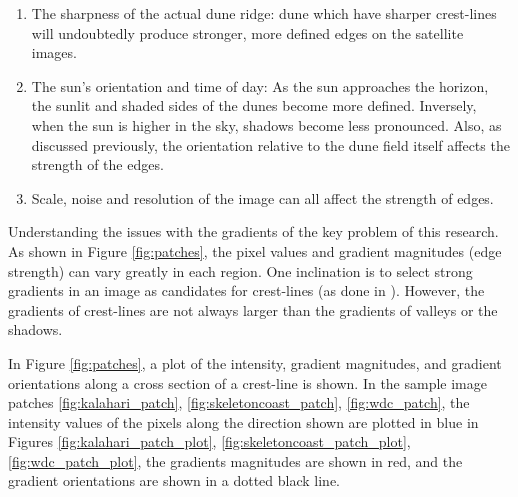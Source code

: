   \begin{enumerate}
	\item The sharpness of the actual dune ridge: dune which have sharper crest-lines will undoubtedly produce stronger, more defined edges on the satellite images.
	\item The sun's orientation and time of day: As the sun approaches the horizon, the sunlit and shaded sides of the dunes become more defined. Inversely, when the sun is higher in the sky, shadows become less pronounced. Also, as discussed previously, the orientation relative to the dune field itself affects the strength of the edges.
	\item Scale, noise and resolution of the image can all affect the strength of edges.
  \end{enumerate}

Understanding the issues with the gradients of the key problem of this research. As shown in Figure \ref{fig:patches}, the pixel values and gradient magnitudes (edge strength) can vary greatly in each region. One inclination is to select strong gradients in an image as candidates for crest-lines (as done in \cite{2015_automated_mapping_of_linear_dunefield}). However, the gradients of crest-lines are not always larger than the gradients of valleys or the shadows. 

In Figure \ref{fig:patches}, a plot of the intensity, gradient magnitudes, and gradient orientations along a cross section of a crest-line is shown. In the sample image patches \ref{fig:kalahari_patch}, \ref{fig:skeletoncoast_patch}, \ref{fig:wdc_patch}, the intensity values of the pixels along the direction shown are plotted in blue in Figures \ref{fig:kalahari_patch_plot}, \ref{fig:skeletoncoast_patch_plot}, \ref{fig:wdc_patch_plot}, the gradients magnitudes are shown in red, and the gradient orientations are shown in a dotted black line. 

